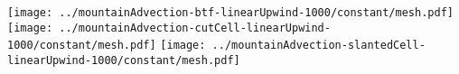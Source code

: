 \documentclass{article}
\begin{document}
\texttt{[image: ../mountainAdvection-btf-linearUpwind-1000/constant/mesh.pdf]}
\texttt{[image: ../mountainAdvection-cutCell-linearUpwind-1000/constant/mesh.pdf]}
\texttt{[image: ../mountainAdvection-slantedCell-linearUpwind-1000/constant/mesh.pdf]}
\end{document}
